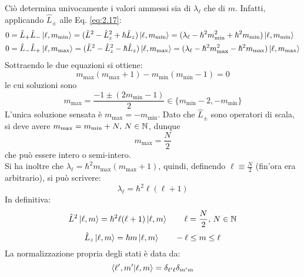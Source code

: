 Ciò determina univocamente i valori ammessi sia di $ \lambda_{\ell} $ che di $ m $. Infatti, applicando $ \hat{L}_{\pm} $ alle Eq. \ref{eq:2.17}:
\begin{equation*}
	\begin{split}
		&0 = \hat{L}_+ \hat{L}_- \ket{\ell,m_{\text{min}}} = (\hat{L}^2 - \hat{L}_z^2 + \hbar\hat{L}_z)\ket{\ell,m_{\text{min}}} = (\lambda_{\ell} - \hbar^2 m_{\text{min}}^2 + \hbar^2 m_{\text{min}}) \ket{\ell,m_{\text{min}}}\\
		&0 = \hat{L}_- \hat{L}_+ \ket{\ell,m_{\text{max}}} = (\hat{L}^2 - \hat{L}_z^2 - \hbar\hat{L}_z)\ket{\ell,m_{\text{max}}} = (\lambda_{\ell} - \hbar^2 m_{\text{max}}^2 - \hbar^2 m_{\text{max}}) \ket{\ell,m_{\text{max}}}
	\end{split}
\end{equation*}
Sottraendo le due equazioni si ottiene:
\begin{equation*}
	m_{\text{max}} (m_{\text{max}} + 1) - m_{\text{min}} (m_{\text{min}} - 1) = 0
\end{equation*}
le cui soluzioni sono
\begin{equation*}
	m_{\text{max}} = \frac{-1 \pm (2m_{\text{min}} - 1)}{2} \in \{ m_{\text{min}} - 2, -m_{\text{min}} \}
\end{equation*}
L'unica soluzione sensata è $ m_{\text{max}} = -m_{\text{min}} $. Dato che $ \hat{L}_{\pm} $ sono operatori di scala, si deve avere $ m_{\text{max}} = m_{\text{min}} + N, \, N\in\mathbb{N} $, dunque
\begin{equation*}
	m_{\text{max}} = \frac{N}{2}
\end{equation*}
che può essere intero o semi-intero.\\
Si ha inoltre che $ \lambda_{\ell} = \hbar^2 m_{\text{max}} (m_{\text{max}} + 1) $, quindi, definendo $ \ell \equiv \frac{N}{2} $ (fin'ora era arbitrario), si può scrivere:
\begin{equation*}
	\lambda_{\ell} = \hbar^2 \ell (\ell + 1)
\end{equation*}
In definitiva:
\begin{equation}
	\hat{L}^2 \ket{\ell,m} = \hbar^2 \ell (\ell + 1) \ket{\ell,m} \qquad \ell = \frac{N}{2},\,N\in\mathbb{N}
	\label{eq:2.18}
\end{equation}
\begin{equation}
	\hat{L}_z \ket{\ell,m} = \hbar m \ket{\ell,m} \qquad -\ell \le m \le \ell
	\label{eq:2.19}
\end{equation}
La normalizzazione propria degli stati è data da:
\begin{equation}
	\braket{\ell',m' | \ell,m} = \delta_{\ell'\ell} \delta_{m'm}
	\label{eq:2.20}
\end{equation}
